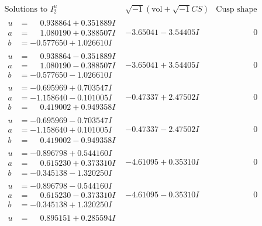 \documentclass[1p]{elsarticle_modified}
\theoremstyle{definition}
\newcommand{\I}{\sqrt{-1}}
\begin{document}
$$\begin{array}{c|c|c}  
\text{Solutions to }I^u_{2}& \I (\text{vol} + \sqrt{-1}CS) & \text{Cusp shape}\\
 \hline 
\begin{aligned}
u &= \phantom{-}0.938864 + 0.351889 I \\
a &= \phantom{-}1.080190 + 0.388507 I \\
b &= -0.577650 + 1.026610 I\end{aligned}
 & -3.65041 - 3.54405 I & \phantom{-0.000000 } 0 \\ \hline\begin{aligned}
u &= \phantom{-}0.938864 - 0.351889 I \\
a &= \phantom{-}1.080190 - 0.388507 I \\
b &= -0.577650 - 1.026610 I\end{aligned}
 & -3.65041 + 3.54405 I & \phantom{-0.000000 } 0 \\ \hline\begin{aligned}
u &= -0.695969 + 0.703547 I \\
a &= -1.158640 - 0.101005 I \\
b &= \phantom{-}0.419002 + 0.949358 I\end{aligned}
 & -0.47337 + 2.47502 I & \phantom{-0.000000 } 0 \\ \hline\begin{aligned}
u &= -0.695969 - 0.703547 I \\
a &= -1.158640 + 0.101005 I \\
b &= \phantom{-}0.419002 - 0.949358 I\end{aligned}
 & -0.47337 - 2.47502 I & \phantom{-0.000000 } 0 \\ \hline\begin{aligned}
u &= -0.896798 + 0.544160 I \\
a &= \phantom{-}0.615230 + 0.373310 I \\
b &= -0.345138 - 1.320250 I\end{aligned}
 & -4.61095 + 0.35310 I & \phantom{-0.000000 } 0 \\ \hline\begin{aligned}
u &= -0.896798 - 0.544160 I \\
a &= \phantom{-}0.615230 - 0.373310 I \\
b &= -0.345138 + 1.320250 I\end{aligned}
 & -4.61095 - 0.35310 I & \phantom{-0.000000 } 0 \\ \hline\begin{aligned}
u &= \phantom{-}0.895151 + 0.285594 I \\

\end{aligned}
\end{array}$$
\end{document}
